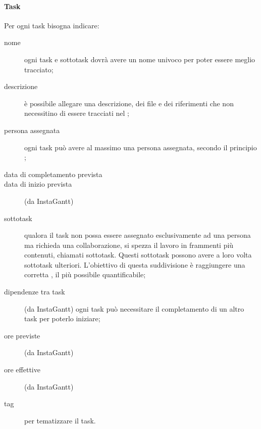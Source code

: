 \paragraph{Task} Per ogni task bisogna indicare:
\begin{description}
	\item[nome] ogni task e sottotask dovrà avere un nome univoco per poter essere meglio tracciato;
	\item[descrizione] è possibile allegare una descrizione, dei file e dei riferimenti che non necessitino di essere tracciati nel ;
	\item[persona assegnata] ogni task può avere al massimo una persona assegnata, secondo il principio ; %
	\item[data di completamento prevista]
	\item[data di inizio prevista] (da InstaGantt)
	\item[sottotask] qualora il task non possa essere assegnato esclusivamente ad una persona ma richieda una collaborazione, si spezza il lavoro in frammenti più contenuti, chiamati sottotask. Questi sottotask possono avere a loro volta sottotask ulteriori. L'obiettivo di questa suddivisione è raggiungere una corretta , il più possibile quantificabile;
	\item[dipendenze tra task] (da InstaGantt) ogni task può necessitare il completamento di un altro task per poterlo iniziare;
	\item[ore previste] (da InstaGantt)
	\item[ore effettive] (da InstaGantt)
	\item[tag] per tematizzare il task.
\end{description}
